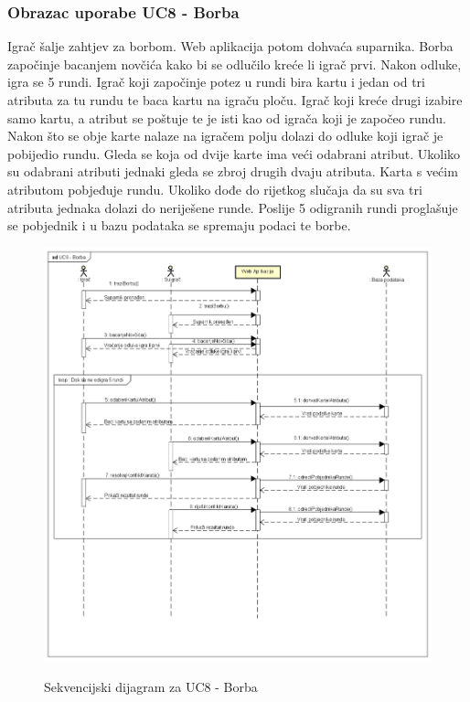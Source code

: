 				\subsubsection{Obrazac uporabe UC8 - Borba}
				\textnormal{Igrač šalje zahtjev za borbom. Web aplikacija potom dohvaća suparnika. Borba započinje bacanjem novčića kako bi se odlučilo kreće li igrač prvi. Nakon odluke, igra se 5 rundi. Igrač koji započinje potez u rundi bira kartu i jedan od tri atributa za tu rundu te baca kartu na igraču ploču. Igrač koji kreće drugi izabire samo kartu, a atribut se poštuje te je isti kao od igrača koji je započeo rundu. Nakon što se obje karte nalaze na igračem polju dolazi do odluke koji igrač je pobijedio rundu. Gleda se koja od dvije karte ima veći odabrani atribut. Ukoliko su odabrani atributi jednaki gleda se zbroj drugih dvaju atributa. Karta s većim atributom pobjeđuje rundu. Ukoliko dođe do rijetkog slučaja da su sva tri atributa jednaka dolazi do neriješene runde. Poslije 5 odigranih rundi proglašuje se pobjednik i u bazu podataka se spremaju podaci te borbe.}\\
				\begin{figure}[H]
					\centering
					\includegraphics[scale=0.52]{dijagrami/UC8 - Borba} \\
					\caption{Sekvencijski dijagram za UC8 - Borba}
					\label{fig:UC8_sekvencijski}
				\end{figure}
			\eject
			
